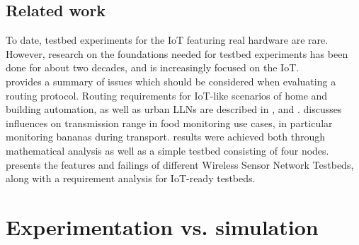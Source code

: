 \documentclass{acm_proc_article-sp}
\begin{document}
\subsection{Related work}
\label{subsec:related_work}
To date, testbed experiments for the IoT featuring real hardware are rare. However, research on the foundations needed for testbed experiments has been done for about two decades, and is increasingly focused on the IoT.\\
\cite{RFC-2501} provides a summary of issues which should be considered when evaluating a routing protocol. Routing requirements for IoT-like scenarios of home and building automation, as well as urban \glspl{LLN} are described in \cite{RFC-5826}, \cite{RFC-5867} and \cite{RFC-5548}.
\cite{food_monitoring} discusses influences on transmission range in food monitoring use cases, in particular monitoring bananas during transport. results were achieved both through mathematical analysis as well as a simple testbed consisting of four nodes.
\cite{testbed-survey} presents the features and failings of different Wireless Sensor Network Testbeds, along with a requirement analysis for IoT-ready testbeds.

\section{Experimentation vs. simulation}
\label{sec:simulation_cons}
\end{document}
